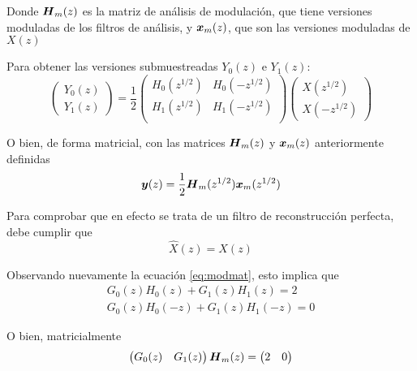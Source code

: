 	Donde $\boldsymbol{H}_m(z)$ es la matriz de análisis de modulación, que tiene versiones moduladas de los filtros de análisis, y $\boldsymbol{x}_m(z)$, que son las versiones moduladas de $X(z)$


	Para obtener las versiones submuestreadas $Y_0(z)$ e $Y_1(z)$:
		\begin{equation}
			\begin{pmatrix}
				Y_0(z) \\
				Y_1(z)
			\end{pmatrix}
			=
			\frac{1}{2}
			\begin{pmatrix}
				H_0(z^{1/2}) & H_0(-z^{1/2}) \\
				H_1(z^{1/2}) & H_1(-z^{1/2}) \\
			\end{pmatrix}
			\begin{pmatrix}
				X(z^{1/2}) \\
				X(-z^{1/2})
			\end{pmatrix}
		\end{equation}
	
	O bien, de forma matricial, con las matrices $\boldsymbol{H}_m(z)$ y $\boldsymbol{x}_m(z)$ anteriormente definidas
		\begin{equation}
			\boldsymbol{y}(z)=\frac{1}{2}\boldsymbol{H}_m(z^{1/2})\boldsymbol{x}_m(z^{1/2})
		\end{equation}

	Para comprobar que en efecto se trata de un filtro de reconstrucción perfecta, debe cumplir que
		\begin{equation}
			\hat{X}(z)=X(z)
		\end{equation}

	Observando nuevamente la ecuación \eqref{eq:modmat}, esto implica que
		\begin{align}
			G_0(z)H_0(z)+G_1(z)H_1(z)=2		\label{eq:modcond}\\
			G_0(z)H_0(-z)+G_1(z)H_1(-z)=0		\label{eq:modcond2}
		\end{align}

	O bien, matricialmente
		\begin{equation}
			\begin{pmatrix}
				G_0(z) & G_1(z)
			\end{pmatrix}
			\boldsymbol{H}_m(z)
			=
			\begin{pmatrix}
				2 & 0
			\end{pmatrix}
		\end{equation}

